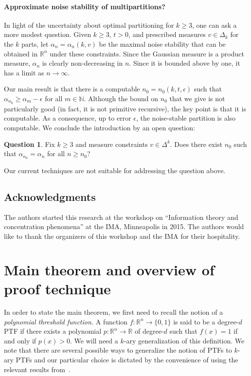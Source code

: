 \documentclass[11pt]{article}
\numberwithin{equation}{section}
\theoremstyle{definition}
\newtheorem{question}[theorem]{Question}
\theoremstyle{plain}
\newcommand{\R}{\mathbb R}
\begin{document}
\paragraph{Approximate noise stability of multipartitions?}
In light of the uncertainty about optimal partitioning for $k \ge 3$, one can
ask a more modest question. Given $k \ge 3$, $t>0$, and prescribed measures $v \in \Delta_k$ for
the $k$ parts, let $\alpha_n = \alpha_n(k, v)$ be the maximal noise stability that can
be obtained in $\R^n$ under these constraints. Since the Gaussian measure
is a product measure, $\alpha_n$ is clearly non-decreasing in $n$.
Since it is bounded above by one, it has a limit as $n \to \infty$.

Our main result is that there is a computable
$n_0=n_0(k,t,\epsilon)$ such that $\alpha_{n_0} \ge \alpha_{m} - \epsilon$ for
all $m \in \mathbb{N}$. Although the bound on $n_0$ that we give is not
particularly good (in fact, it is not primitive recursive), the key point is that it is  computable.
As a consequence, up to error $\epsilon$, the noise-stable partition is
also  computable.
We conclude the introduction by an open question: 
\begin{question}
    Fix $k \ge 3$ and measure constraints $v \in \Delta^k$. Does there exist $n_0$ such that $\alpha_{n_0} = \alpha_{n}$ for all $n \ge n_0$? 
\end{question}
Our current techniques are not suitable for addressing the question above. 

\subsection{Acknowledgments} 
The authors started this research at the workshop on ``Information theory and concentration phenomena'' at the IMA, Minneapolis in 2015. The authors would like to thank the organizers of this workshop and the IMA for their hospitality. 

\section{Main theorem and overview of proof technique} \label{sec:theorem}
In order to state the main theorem, we first need to recall the notion of a
\emph{polynomial threshold function.} %
A function  $f: \mathbb{R}^n \rightarrow \{0,1\}$ is said to be a degree-$d$ PTF if there exists a polynomial $p: \mathbb{R}^n \rightarrow \mathbb{R}$ of degree-$d$ such that $f(x) = 1$ if and only if $p(x) > 0$. We will need a $k$-ary generalization of this definition. We note that there are several possible ways to generalize the notion of PTFs to $k$-ary PTFs and our particular choice is dictated by the convenience of using the relevant results from~\cite{DS14}. 
\end{document}
